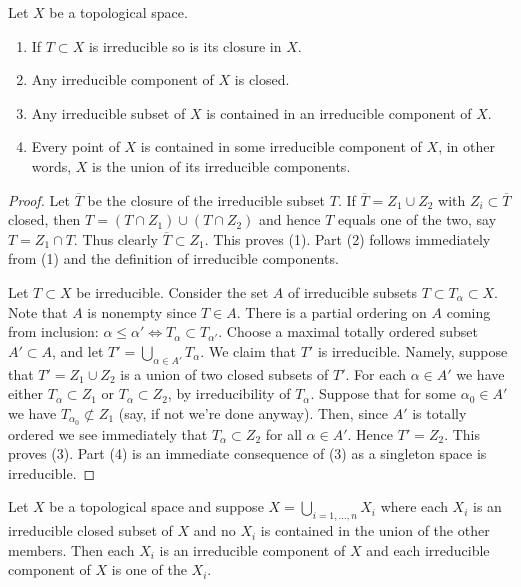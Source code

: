 \begin{lemma}
\label{lemma-irreducible}
Let $X$ be a topological space.
\begin{enumerate}
\item If $T \subset X$ is irreducible so is its closure in $X$.
\item Any irreducible component of $X$ is closed.
\item Any irreducible subset of $X$ is contained in an
irreducible component of $X$.
\item Every point of $X$ is contained in some irreducible component
of $X$, in other words, $X$ is the union of its irreducible components.
\end{enumerate}
\end{lemma}

\begin{proof}
Let $\overline{T}$ be the closure of the irreducible subset $T$.
If $\overline{T} = Z_1 \cup Z_2$ with $Z_i \subset \overline{T}$
closed, then $T = (T\cap Z_1) \cup (T \cap Z_2)$ and hence
$T$ equals one of the two, say $T = Z_1 \cap T$. Thus clearly
$\overline{T} \subset Z_1$. This proves (1). Part (2) follows
immediately from (1) and the definition of irreducible components.

\medskip\noindent
Let $T \subset X$ be irreducible. Consider the set $A$ of irreducible subsets
$T \subset T_\alpha \subset X$. Note that $A$ is nonempty since
$T \in A$. There is a partial ordering on $A$ coming from
inclusion: $\alpha \leq \alpha' \Leftrightarrow T_\alpha \subset T_{\alpha'}$.
Choose a maximal totally ordered subset $A' \subset A$, and let
$T' = \bigcup_{\alpha \in A'} T_\alpha$. We claim that $T'$ is
irreducible. Namely, suppose that $T' =  Z_1 \cup Z_2$ is a union
of two closed subsets of $T'$. For each $\alpha \in A'$ we have
either $T_\alpha \subset Z_1$ or $T_\alpha \subset Z_2$, by irreducibility
of $T_\alpha$. Suppose that for some $\alpha_0 \in A'$ we have
$T_{\alpha_0} \not\subset Z_1$ (say, if not we're done anyway).
Then, since $A'$ is totally ordered we see immediately that
$T_\alpha \subset Z_2$ for all $\alpha \in A'$. Hence $T' = Z_2$.
This proves (3). Part (4) is an immediate consequence of (3)
as a singleton space is irreducible.
\end{proof}

\begin{lemma}
\label{lemma-pick-irreducible-components}
Let $X$ be a topological space and suppose $X = \bigcup_{i = 1, \ldots, n} X_i$
where each $X_i$ is an irreducible closed subset of $X$ and no $X_i$
is contained in the union of the other members.  Then each $X_i$ is an
irreducible component of $X$ and each irreducible component of $X$
is one of the $X_i$.
\end{lemma}

